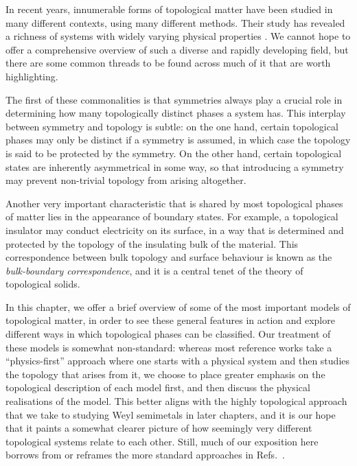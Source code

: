 \label{chap:topo-states}

In recent years, innumerable forms of topological matter have been studied in many different contexts, using many different methods. Their study has revealed a richness of systems with widely varying physical properties \cite{Akhmerov_online-course,Asboth_topo-course,Bernevig_topological-insulators,Sato_superconductors}. We cannot hope to offer a comprehensive overview of such a diverse and rapidly developing field, but there are some common threads to be found across much of it that are worth highlighting.

The first of these commonalities is that symmetries always play a crucial role in determining how many topologically distinct phases a system has. This interplay between symmetry and topology is subtle: on the one hand, certain topological phases may only be distinct if a symmetry is assumed, in which case the topology is said to be protected by the symmetry. On the other hand, certain topological states are inherently asymmetrical in some way, so that introducing a symmetry may prevent non-trivial topology from arising altogether.

Another very important characteristic that is shared by most topological phases of matter lies in the appearance of boundary states. For example, a topological insulator may conduct electricity on its surface, in a way that is determined and protected by the topology of the insulating bulk of the material. This correspondence between bulk topology and surface behaviour is known as the \emph{bulk-boundary correspondence}, and it is a central tenet of the theory of topological solids.

In this chapter, we offer a brief overview of some of the most important models of topological matter, in order to see these general features in action and explore different ways in which topological phases can be classified. Our treatment of these models is somewhat non-standard: whereas most reference works take a ``physics-first'' approach where one starts with a physical system and then studies the topology that arises from it, we choose to place greater emphasis on the topological description of each model first, and then discuss the physical realisations of the model. This better aligns with the highly topological approach that we take to studying Weyl semimetals in later chapters, and it is our hope that it paints a somewhat clearer picture of how seemingly very different topological systems relate to each other. Still, much of our exposition here borrows from or reframes the more standard approaches in Refs.~\cite{Akhmerov_online-course,Asboth_topo-course,Bernevig_topological-insulators,Sato_superconductors}.

